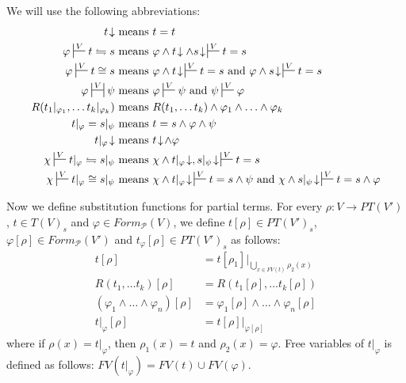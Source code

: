 \documentclass{elsarticle}
\theoremstyle{definition}
\theoremstyle{remark}
\numberwithin{figure}{section}
\begin{document}
We will use the following abbreviations:
\begin{align*}
t\!\downarrow & \text{ means } t = t \\
\varphi \sststile{}{V} t \leftrightharpoons s & \text{ means } \varphi \land t\!\downarrow \land s\!\downarrow\,\sststile{}{V} t = s \\
\varphi \sststile{}{V} t \cong s & \text{ means } \varphi \land t\!\downarrow\,\sststile{}{V} t = s \text{ and } \varphi \land s\!\downarrow\,\sststile{}{V} t = s \\
\varphi \ssststile{}{V} \psi & \text{ means } \varphi \sststile{}{V} \psi \text{ and } \psi \sststile{}{V} \varphi \\
R(t_1|_{\varphi_1}, \ldots t_k|_{\varphi_k}) & \text{ means } R(t_1, \ldots t_k) \land \varphi_1 \land \ldots \land \varphi_k \\
t|_\varphi = s|_\psi & \text{ means } t = s \land \varphi \land \psi \\
t|_\varphi\!\downarrow & \text{ means } t\!\downarrow\!\land \varphi \\
\chi \sststile{}{V} t|_\varphi \leftrightharpoons s|_\psi & \text{ means } \chi \land t|_\varphi\!\downarrow, s|_\psi\!\downarrow\,\sststile{}{V} t = s \\
\chi \sststile{}{V} t|_\varphi \cong s|_\psi & \text{ means } \chi \land t|_\varphi\!\downarrow\,\sststile{}{V} t = s \land \psi \text{ and } \chi \land s|_\psi\!\downarrow\,\sststile{}{V} t = s \land \varphi
\end{align*}

Now we define substitution functions for partial terms.
For every $\rho : V \to PT(V')$, $t \in T(V)_s$ and $\varphi \in Form_\mathcal{P}(V)$,
we define $t[\rho] \in PT(V')_s$, $\varphi[\rho] \in Form_\mathcal{P}(V')$ and $t_\varphi[\rho] \in PT(V')_s$ as follows:
\begin{align*}
t[\rho] & = t[\rho_1]|_{\bigcup_{x \in FV(t)} \rho_2(x)} \\
R(t_1, \ldots t_k)[\rho] & = R(t_1[\rho], \ldots t_k[\rho]) \\
(\varphi_1 \land \ldots \land \varphi_n)[\rho] & = \varphi_1[\rho] \land \ldots \land \varphi_n[\rho] \\
t|_\varphi[\rho] & = t[\rho]|_{\varphi[\rho]}
\end{align*}
where if $\rho(x) = t|_\varphi$, then $\rho_1(x) = t$ and $\rho_2(x) = \varphi$.
Free variables of $t|_\varphi$ is defined as follows: $FV(t|_\varphi) = FV(t) \cup FV(\varphi)$.
\end{document}
